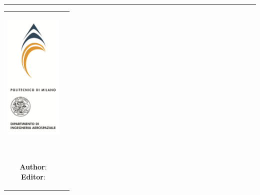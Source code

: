 \thispagestyle{empty}

\vspace{3cm}
\begin{center}
\bigskip
\Large{\myDate}
\vspace{0.5cm}

{\titlecap{\myProject} \\
\vspace{0.3cm}
\titlecap{\myPhase}}\\
\vspace{0.4cm}
\rule{\linewidth}{0.5mm}
\titlecap{\myTitle}

\vfill

\begin{tabular}{cc}

\parbox{0.3\textwidth}{\includegraphics[height=6cm]{gfx/SkywardPoli}}

\parbox{0.7\textwidth}{{\subtitlecap{}}

					{\normalsize
						\textrm{\myGroup \\
						\myUni \\
						\textbf{Author}: {\myAuthor}\\
						\textbf{Editor}: {\myEditor}}}}
\end{tabular}
\end{center}
\clearpage
